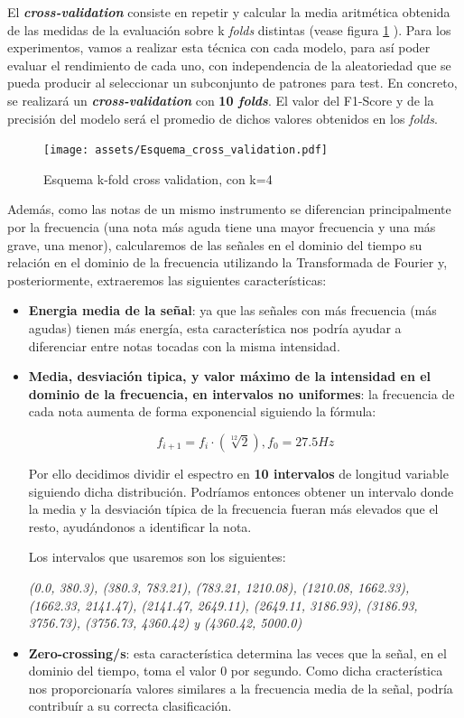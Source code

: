 \documentclass[12pt]{article}
\begin{document}
\bigskip
El \textbf{\textit{cross-validation}} consiste en repetir y calcular la media aritmética obtenida de las medidas de la evaluación 
sobre k \textit{folds} distintas (vease figura \ref{fig:esquema-cross-validation} ). Para los experimentos, vamos a realizar 
esta técnica con cada modelo, para así poder evaluar el rendimiento de cada uno, con independencia de la aleatoriedad que se 
pueda producir al seleccionar un subconjunto de patrones para test. 
En concreto, se realizará un \textbf{\textit{cross-validation}} con \textbf{10 \textit{folds}}. El valor del F1-Score y de la precisión
del modelo será el promedio de dichos valores obtenidos en los \textit{folds}.

\begin{figure}[!h]
	\centering
	\texttt{[image: assets/Esquema\_cross\_validation.pdf]}
	\caption{Esquema k-fold cross validation, con k=4}
	\label{fig:esquema-cross-validation}
\end{figure}

\bigskip
Además, como las notas de un mismo instrumento se diferencian principalmente por la frecuencia (una nota más aguda tiene una mayor frecuencia
y una más grave, una menor), calcularemos de las señales en el dominio del tiempo su relación en el dominio de la frecuencia utilizando la
Transformada de Fourier y, posteriormente, extraeremos las siguientes características:
\begin{itemize}
	\item \textbf{Energia media de la señal}: ya que las señales con más frecuencia (más agudas) tienen más energía, esta característica nos podría
		ayudar a diferenciar entre notas tocadas con la misma intensidad.
	\item \textbf{Media, desviación tipica, y valor máximo de la intensidad en el dominio de la frecuencia, en intervalos no uniformes}: la frecuencia de cada nota
		aumenta de forma exponencial siguiendo la fórmula:

		\begin{equation}
			f_{i+1} = f_{i}\cdot(\sqrt[12]{2}), f_0 = 27.5 Hz
		\end{equation}

		Por ello decidimos dividir el espectro en \textbf{10 intervalos} de longitud variable siguiendo dicha distribución. 
		Podríamos entonces obtener un intervalo donde la media y la desviación típica de la frecuencia fueran más elevados que el resto,
		ayudándonos a identificar la nota.
		
		Los intervalos que usaremos son los siguientes:
		
		\textit{(0.0, 380.3), (380.3, 783.21), (783.21, 1210.08), (1210.08, 1662.33),\newline
		(1662.33, 2141.47), (2141.47, 2649.11), (2649.11, 3186.93), (3186.93, 3756.73), 
		(3756.73, 4360.42) y (4360.42, 5000.0)}
	\item \textbf{Zero-crossing/s}: esta característica determina las veces que la señal, en el dominio del tiempo, toma el valor 0 por segundo.
		Como dicha cracterística nos proporcionaría valores similares a la frecuencia media de la señal, podría contribuír a su correcta clasificación.
\end{itemize}
\end{document}
